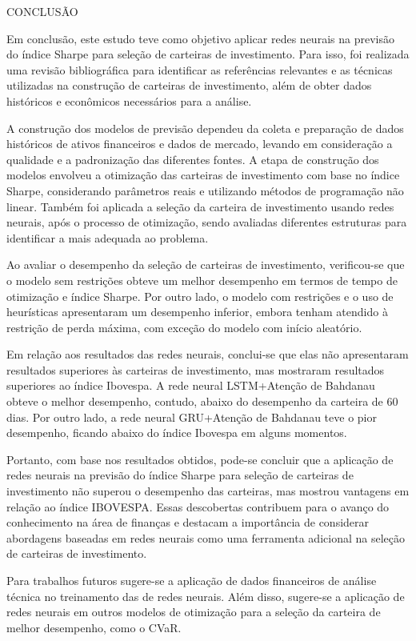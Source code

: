 \begin{section}{CONCLUSÃO}
    
        \ipar Em conclusão, este estudo teve como objetivo aplicar redes neurais na previsão do índice Sharpe para seleção de carteiras de investimento. Para isso, foi realizada uma revisão bibliográfica para identificar as referências relevantes e as técnicas utilizadas na construção de carteiras de investimento, além de obter dados históricos e econômicos necessários para a análise.

        \ipar A construção dos modelos de previsão dependeu da coleta e preparação de dados históricos de ativos financeiros e dados de mercado, levando em consideração a qualidade e a padronização das diferentes fontes. A etapa de construção dos modelos envolveu a otimização das carteiras de investimento com base no índice Sharpe, considerando parâmetros reais e utilizando métodos de programação não linear. Também foi aplicada a seleção da carteira de investimento usando redes neurais, após o processo de otimização, sendo avaliadas diferentes estruturas para identificar a mais adequada ao problema.

        \ipar Ao avaliar o desempenho da seleção de carteiras de investimento, verificou-se que o modelo sem restrições obteve um melhor desempenho em termos de tempo de otimização e índice Sharpe. Por outro lado, o modelo com restrições e o uso de heurísticas apresentaram um desempenho inferior, embora tenham atendido à restrição de perda máxima, com exceção do modelo com início aleatório.

        \ipar Em relação aos resultados das redes neurais, conclui-se que elas não apresentaram resultados superiores às carteiras de investimento, mas mostraram resultados superiores ao índice Ibovespa. A rede neural \acrshort{LSTM}+Atenção de Bahdanau obteve o melhor desempenho, contudo, abaixo do desempenho da carteira de 60 dias. Por outro lado, a rede neural GRU+Atenção de Bahdanau teve o pior desempenho, ficando abaixo do índice Ibovespa em alguns momentos.

        \ipar Portanto, com base nos resultados obtidos, pode-se concluir que a aplicação de redes neurais na previsão do índice Sharpe para seleção de carteiras de investimento não superou o desempenho das carteiras, mas mostrou vantagens em relação ao índice \acrshort{IBOVESPA}. Essas descobertas contribuem para o avanço do conhecimento na área de finanças e destacam a importância de considerar abordagens baseadas em redes neurais como uma ferramenta adicional na seleção de carteiras de investimento.

        \ipar Para trabalhos futuros sugere-se a aplicação de dados financeiros de análise técnica no treinamento das de redes neurais. Além disso, sugere-se a aplicação de redes neurais em outros modelos de otimização para a seleção da carteira de melhor desempenho, como o \acrshort{CVaR}.

\end{section}

\pagebreak